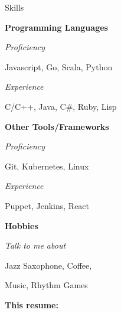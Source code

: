 \begin{minipage}[t]{0.305\textwidth}
  \vspace{10pt}

  {\sectionfont Skills}

  \vspace{5pt}
  \textbf{Programming Languages}
  \vspace{2pt}
  \begin{adjustwidth}{10pt}{}
    \emph{Proficiency}

    \quad Javascript, Go, Scala, Python

    \emph{Experience}

    \quad C/C++, Java, C\#, Ruby, Lisp

  \end{adjustwidth}

  \vspace{5pt}
  \textbf{Other Tools/Frameworks}
  \vspace{2pt}
  \begin{adjustwidth}{10pt}{}
    \emph{Proficiency}

    \quad Git, Kubernetes, Linux

    \emph{Experience}

    \quad Puppet, Jenkins, React
  \end{adjustwidth}

  \vspace{5pt}
  \textbf{Hobbies}
  \vspace{2pt}
  \begin{adjustwidth}{10pt}{}
    \emph{Talk to me about}

    \quad Jazz Saxophone, Coffee,

    \quad Music, Rhythm Games
  \end{adjustwidth}

  \vspace{20pt}

  \textbf{This resume:}\enspace









\end{minipage}
